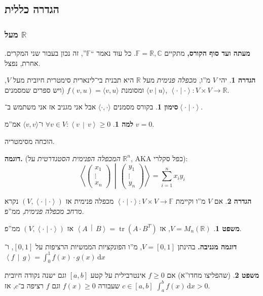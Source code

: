 \documentclass[a4paper]{article}
\newcommand\R     {\mathbb{R}}
\newcommand\C     {\mathbb{C}}
\newcommand\ra    {\rangle}
\newcommand\la    {\langle}
\newcommand\dx    {\,\mathrm{d}x}
\DeclareMathOperator{\tr}      {tr}
\newcommand\F         {\mathbb{F}}
\newcommand\co        {\colon}
\newcommand\pms[1]    {\begin{pmatrix}
		#1
\end{pmatrix}}
\newcommand\smut      {\left \la \cdot \mid \cdot \right \ra}
\newcommand\mut [2]   {\left \la #1 \,\middle|\, #2 \right \ra}
\theoremstyle{definition}
\newtheorem{Theorem}{\color{myblue}משפט}
\newtheorem{Definition}{\color{mygreen}הגדרה}
\newtheorem{Lemma}{\color{myyellow}למה}
\newtheorem{Notion}{\color{myred}סימון}
\newcommand\theo  [1] {\begin{Theorem}#1\end{Theorem}}
\newcommand\defi  [1] {\begin{Definition}#1\end{Definition}}
\newcommand\lem   [1] {\begin{Lemma}#1\end{Lemma}}
\newcommand\noti  [1] {\begin{Notion}#1\end{Notion}}
\begin{document}
	\subsection{הגדרה כללית}
	\subsubsection{מעל $\R$}
	\textbf{מעתה ועד סוף הקורס, }מתקיים $\F = \R, \C$. 
	כל עוד נאמר ``$\F$'', זה נכון בעבור שני המקרים. אחרת, נפצל. 
	
	\defi{יהי $V$ מ''ו, \textit{מכפלה פנימית} מעל $\R$ היא תבנית בי־לינארית סימטרית חיובית מעל $V$, ומסומנת $f(v, u) = \la v, u \ra$ (ויש ספרים שמסמנים $\la v \mid u \ra$, $\smut\co V \times V \to \R$. }
	\noti{בקורס מסמנים $\la \cdot, \cdot \ra$ אבל אני מגניב אז אני משתמש ב־$\smut$. }
	
	\lem{$\forall v \in V \co \mut{v}{v} \ge 0$ ו־$\la v, v \ra$ אמ''מ $v = 0$. }הוכחה מסימטריה. 
	
	\textbf{דוגמה. }(\textit{המכפלה הפנימית הסטנדרטית} על $\R^n$, AKA כפל סקלרי): 
	\[ \mut{\pms{x_1 \\ \vdots\\ x_n}}{\pms{y_1 \\ \vdots \\ y_n}} = \sum_{i = 1}^{n}x_iy_i \]
	
	\defi{אם $V$ מ''ו וקיימת $\smut \co V \times V \to \F$ מכפלה פנימית אז $(V, \smut)$ נקרא \textit{מרחב מכפלה פנימית}, ממ''פ. }
	
	\theo{$V = M_n(\R)$, אז $\mut{A}{B} = \tr(A \cdot B^T)$ אז $(V, \smut)$ ממ''פ. }
	
	\textbf{דוגמה מגניבה. }בהינתן $V = [0, 1]$, מ''ו הפונקציות הממשיות הרציפות על $[0, 1]$, ו־$\mut{f}{g} = \int_0^1 f(x) \cdot g(x) \dx$ 
	\theo{(שהפליצו מחדו''א) אם $f \ge 0$ אינטרבילית על קטע $[a, b]$ וגם ישנה נקודה חיובית $c \in [a, b]$ שעבורה $f(x) \ge 0$ וגם $f$ רציפה ב־$c$, אז $\int^b_a f(x) \dx > 0$. }
	
\end{document}
